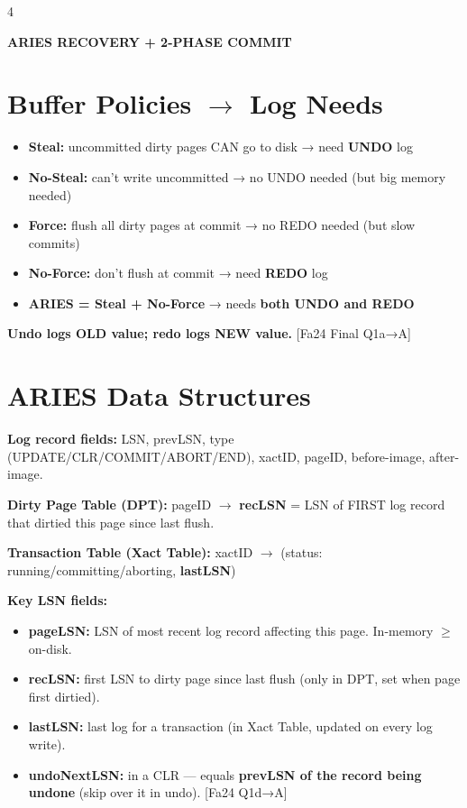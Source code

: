 \documentclass[8pt,letterpaper]{article}
\newcommand{\titlefont}{\fontsize{6.5}{7.5}\selectfont}
\newcommand{\key}[1]{\textbf{\color{red!70!black}#1}}
\newcommand{\qref}[1]{{\fontsize{3.5}{4}\selectfont\color{purple!60!black}[#1]}}
\begin{document}
\begin{multicols*}{4}
\centerline{\titlefont\textbf{\color{purple!80!black}ARIES RECOVERY + 2-PHASE COMMIT}}
\vspace{1pt}

\section{Buffer Policies $\to$ Log Needs}
\begin{itemize}
  \item \textbf{Steal:} uncommitted dirty pages CAN go to disk → need \textbf{UNDO} log
  \item \textbf{No-Steal:} can't write uncommitted → no UNDO needed (but big memory needed)
  \item \textbf{Force:} flush all dirty pages at commit → no REDO needed (but slow commits)
  \item \textbf{No-Force:} don't flush at commit → need \textbf{REDO} log
  \item \textbf{ARIES = Steal + No-Force} → needs \textbf{both UNDO and REDO}
\end{itemize}

\key{Undo logs OLD value; redo logs NEW value.} \qref{Fa24 Final Q1a→A}

\section{ARIES Data Structures}
\key{Log record fields:} LSN, prevLSN, type (UPDATE/CLR/COMMIT/ABORT/END), xactID, pageID, before-image, after-image.

\key{Dirty Page Table (DPT):} pageID $\to$ \textbf{recLSN} = LSN of FIRST log record that dirtied this page since last flush.

\key{Transaction Table (Xact Table):} xactID $\to$ (status: running/committing/aborting, \textbf{lastLSN})

\key{Key LSN fields:}
\begin{itemize}
  \item \textbf{pageLSN:} LSN of most recent log record affecting this page. In-memory $\ge$ on-disk.
  \item \textbf{recLSN:} first LSN to dirty page since last flush (only in DPT, set when page first dirtied).
  \item \textbf{lastLSN:} last log for a transaction (in Xact Table, updated on every log write).
  \item \textbf{undoNextLSN:} in a CLR — equals \textbf{prevLSN of the record being undone} (skip over it in undo). \qref{Fa24 Q1d→A}
\end{itemize}


\end{multicols*}
\end{document}
